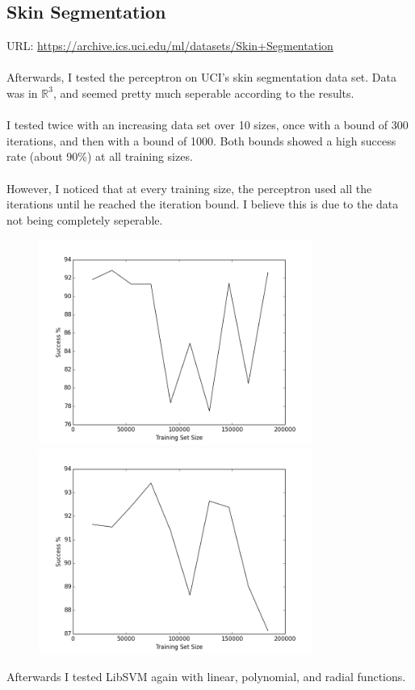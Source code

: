 \documentclass[a4paper]{article}
\begin{document}
\newpage

\subsection {Skin Segmentation}

URL: \url{https://archive.ics.uci.edu/ml/datasets/Skin+Segmentation}
\\\\
Afterwards, I tested the perceptron on UCI's skin segmentation data set.
Data was in $\mathbb{R}^3$, and seemed pretty much seperable according to the results.
\\\\
I tested twice with an increasing data set over 10 sizes,
once with a bound of 300 iterations, and then with a bound of 1000.
Both bounds showed a high success rate (about 90\%) at all training sizes.
\\\\
However, I noticed that at every training size,
the perceptron used all the iterations until he reached the iteration bound.
I believe this is due to the data not being completely seperable.

\begin{figure}[h!]
    \includegraphics[width=0.8\textwidth]{images/300_iterations.png}
    \includegraphics[width=0.8\textwidth]{images/1000_iterations.png}
\end{figure}

\newpage

Afterwards I tested LibSVM again with linear, polynomial, and radial functions.
\end{document}

